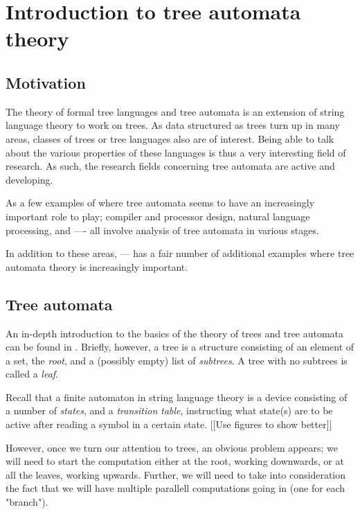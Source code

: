 \section{Introduction to tree automata theory}

\subsection{Motivation}

The theory of formal tree languages and tree automata is an extension of
string language theory to work on trees. As data structured as trees turn
up in many areas, classes of trees or tree languages also are of interest.
Being able to talk about the various properties of these languages is thus
a very interesting field of research. As such, the research fields
concerning tree automata are active and developing.

As a few examples of where tree automata seems to have an increasingly
important role to play; compiler and processor design, natural language
processing, and ---- all involve analysis of tree automata in various
stages.

In addition to these areas, --- has a fair number of additional examples
where tree automata theory is increasingly important.




\subsection{Tree automata}

An in-depth introduction to the basics of the theory of trees and tree
automata can be found in \cite{engelfriet_notes}. Briefly, however, a tree
is a structure consisting of an element of a set, the \emph{root}, and a
(possibly empty) list of \emph{subtrees}. A tree with no subtrees is called
a \emph{leaf}.

Recall that a finite automaton in string language theory is a device
consisting of a number of \emph{states}, and a \emph{transition table},
instructing what state(s) are to be active after reading a symbol in a
certain state. [[Use figures to show better]]

However, once we turn our attention to trees, an obvious problem appears;
we will need to start the computation either at the root, working
downwards, or at all the leaves, working upwards. Further, we will need to
take into consideration the fact that we will have multiple parallell
computations going in (one for each "branch").

